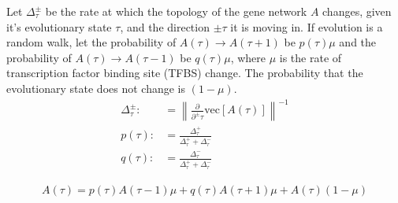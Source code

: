 \documentclass[11 pt]{article}
\newcommand{\1}{\mathbbm{1}}
\begin{document}
  Let $\Delta_{\tau}^{\pm}$ be the rate at which the topology of the gene network $A$ changes, given it's evolutionary state $\tau$, and the direction $\pm \tau$ it is moving in. If evolution is a random walk, let the probability of $A(\tau) \rightarrow A(\tau + 1)$ be $p(\tau) \mu$ and the probability of $A(\tau) \rightarrow A(\tau - 1)$ be $q(\tau) \mu$, where $\mu$ is the rate of transcription factor binding site (TFBS) change. The probability that the evolutionary state does not change is $(1-\mu)$. 
  \begin{align*}
    \Delta^{\pm}_{\tau} :&= \left\lVert \frac{\partial}{\partial^{\pm} \tau} \text{vec}\left[A(\tau)\right] \right\rVert^{-1} \\
    p(\tau) :&= \frac{\Delta^{+}_{\tau}}{\Delta^{+}_{\tau} + \Delta^{-}_{\tau}} \\
    q(\tau) :&= \frac{\Delta^{-}_{\tau}}{\Delta^{+}_{\tau} + \Delta^{-}_{\tau}}
  \end{align*}

  \begin{align*}
    A(\tau) = p(\tau) A(\tau - 1) \mu + q(\tau) A (\tau + 1) \mu + A(\tau) (1 - \mu)
  \end{align*}



\end{document}
